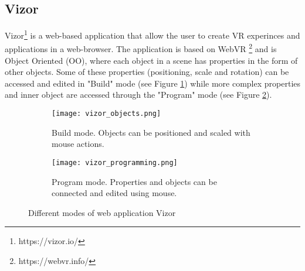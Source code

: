 \subsection{Vizor}
Vizor\footnote{https://vizor.io/} is a web-based application that allow the user to create VR experinces and applications in a web-browser. The application is based on WebVR \footnote{https://webvr.info/} and is Object Oriented (OO), where each object in a scene has properties in the form of other objects. Some of these properties (positioning, scale and rotation) can be accessed and edited in "Build" mode (see Figure \ref{fig:vizor:buildmode}) while more complex properties and inner object are accessed through the "Program" mode (see Figure \ref{fig:vizor:programmode}).

\begin{figure}
\begin{subfigure}{.5\textwidth}
  \centering
  \texttt{[image: vizor\_objects.png]}
  \caption{Build mode. Objects can be positioned and scaled with mouse actions.}
  \label{fig:vizor:buildmode}
\end{subfigure}%
\begin{subfigure}{.5\textwidth}
  \centering
  \texttt{[image: vizor\_programming.png]}
  \caption{Program mode. Properties and objects can be connected and edited using mouse. }
  \label{fig:vizor:programmode}
\end{subfigure}
\caption{Different modes of web application Vizor}
\label{fig:vizor}
\end{figure}
